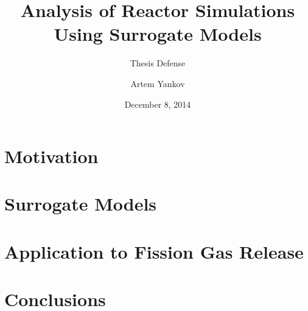 \documentclass{beamer}
\title[]{Analysis of Reactor Simulations \\ Using Surrogate Models}
\subtitle[]{Thesis Defense}
\author[]{Artem Yankov}
\institute[]{University of Michigan}
\date{December 8, 2014}
\begin{document}
\begin{frame}
\titlepage
\end{frame}

\section{Motivation}


\section{Surrogate Models}


\section{Application to Fission Gas Release}



\section{Conclusions}

\end{document}
